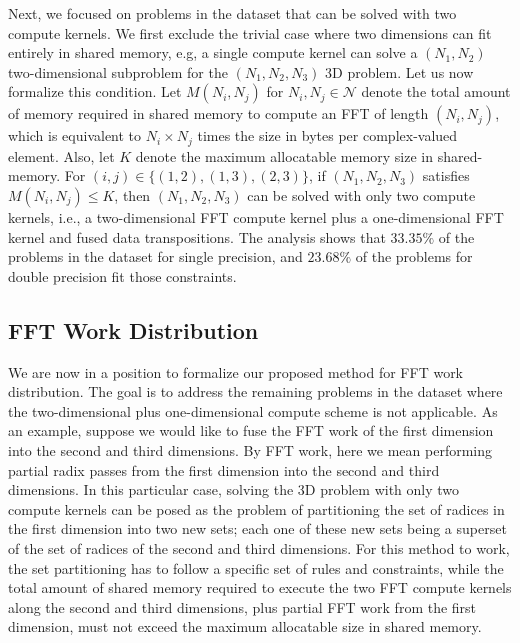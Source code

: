 \documentclass[11pt, onecolumn, journal,compsoc]{IEEEtran}
\theoremstyle{problemstyle}
\begin{document}
Next, we focused on problems in the dataset that can be solved with two compute kernels. We first exclude the trivial case where two dimensions can fit entirely in shared memory, e.g, a single compute kernel can solve a $(N_1,N_2)$ two-dimensional subproblem for the $(N_1,N_2,N_3)$ 3D problem. Let us now formalize this condition. Let $M(N_i,N_j)$ for $N_i,N_j \in \mathcal{N}$ denote the total amount of memory required in shared memory to compute an FFT of length $(N_i,N_j)$, which is equivalent to $N_i \times N_j$ times the size in bytes per complex-valued element. Also, let $K$ denote the maximum allocatable memory size in shared-memory. For $(i,j) \in \bigl \{ (1,2), (1,3), (2,3) \bigr \}$, if $(N_1,N_2,N_3)$ satisfies $M(N_i, N_j) \leq K$, then $(N_1,N_2,N_3)$ can be solved with only two compute kernels, i.e., a two-dimensional FFT compute kernel plus a one-dimensional FFT kernel and fused data transpositions. The analysis shows that $33.35 \%$ of the problems in the dataset for single precision, and $23.68 \%$ of the problems for double precision fit those constraints.

\subsection{FFT Work Distribution}

We are now in a position to formalize our proposed method for FFT work distribution. The goal is to address the remaining problems in the dataset where the two-dimensional plus one-dimensional compute scheme is not applicable. As an example, suppose we would like to fuse the FFT work of the first dimension into the second and third dimensions. By FFT work, here we mean performing partial radix passes from the first dimension into the second and third dimensions. In this particular case, solving the 3D problem with only two compute kernels can be posed as the problem of partitioning the set of radices in the first dimension into two new sets; each one of these new sets being a superset of the set of radices of the second and third dimensions. For this method to work, the set partitioning has to follow a specific set of rules and constraints, while the total amount of shared memory required to execute the two FFT compute kernels along the second and third dimensions, plus partial FFT work from the first dimension, must not exceed the maximum allocatable size in shared memory.
\end{document}

